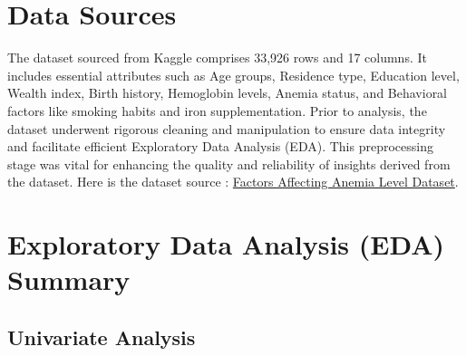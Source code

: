 \section{Data Sources}

The dataset sourced from Kaggle comprises 33,926 rows and 17 columns. It includes essential attributes such as Age groups, Residence type, Education level, Wealth index, Birth history, Hemoglobin levels, Anemia status, and Behavioral factors like smoking habits and iron supplementation. Prior to analysis, the dataset underwent rigorous cleaning and manipulation to ensure data integrity and facilitate efficient Exploratory Data Analysis (EDA). This preprocessing stage was vital for enhancing the quality and reliability of insights derived from the dataset. Here is the dataset source :
\href{https://www.kaggle.com/datasets/adeolaadesina/factors-affecting-children-anemia-level/data}{Factors Affecting Anemia Level Dataset}.
























\section{Exploratory Data Analysis (EDA) Summary}






\subsection{Univariate Analysis}


